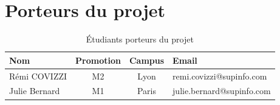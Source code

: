 \section{Porteurs du projet}

\begin{table}[H]
\centering
\begin{tabular}{|l|c|c|l|}
\hline
Nom & Promotion & Campus & Email \\
\hline
Rémi COVIZZI & M2 & Lyon & remi.covizzi@supinfo.com \\
Julie Bernard & M1 & Paris & julie.bernard@supinfo.com \\
\hline
\end{tabular}
\caption{Étudiants porteurs du projet}
\end{table}
